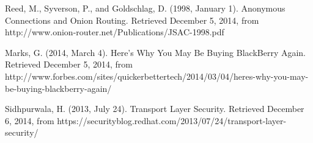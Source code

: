 \documentclass[12pt]{article}
\begin{document}
\begin{thebibliography}{99}
	Reed, M., Syverson, P., and Goldschlag, D. (1998, January 1). Anonymous Connections and Onion Routing. Retrieved December 5, 2014, from http://www.onion-router.net/Publications/JSAC-1998.pdf

	Marks, G. (2014, March 4). Here's Why You May Be Buying BlackBerry Again. Retrieved December 5, 2014, from http://www.forbes.com/sites/quickerbettertech/2014/03/04/heres-why-you-may-be-buying-blackberry-again/

	Sidhpurwala, H. (2013, July 24). Transport Layer Security. Retrieved December 6, 2014, from https://securityblog.redhat.com/2013/07/24/transport-layer-security/
\end{thebibliography}
\end{document}
